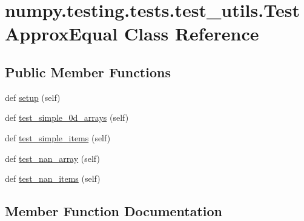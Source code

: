 \hypertarget{classnumpy_1_1testing_1_1tests_1_1test__utils_1_1TestApproxEqual}{}\section{numpy.\+testing.\+tests.\+test\+\_\+utils.\+Test\+Approx\+Equal Class Reference}
\label{classnumpy_1_1testing_1_1tests_1_1test__utils_1_1TestApproxEqual}
\subsection*{Public Member Functions}
\begin{DoxyCompactItemize}
\item 
def \hyperlink{classnumpy_1_1testing_1_1tests_1_1test__utils_1_1TestApproxEqual_a11b9926fc00819448956491c5e8757d2}{setup} (self)
\item 
def \hyperlink{classnumpy_1_1testing_1_1tests_1_1test__utils_1_1TestApproxEqual_acc2f61a6b487803b87dd06b2d012f88f}{test\+\_\+simple\+\_\+0d\+\_\+arrays} (self)
\item 
def \hyperlink{classnumpy_1_1testing_1_1tests_1_1test__utils_1_1TestApproxEqual_a57ab3663ef4f6b444edf47cd74a93d02}{test\+\_\+simple\+\_\+items} (self)
\item 
def \hyperlink{classnumpy_1_1testing_1_1tests_1_1test__utils_1_1TestApproxEqual_a0d217822bed46eabe2b7da70c173633c}{test\+\_\+nan\+\_\+array} (self)
\item 
def \hyperlink{classnumpy_1_1testing_1_1tests_1_1test__utils_1_1TestApproxEqual_a5f5f31d29b9335f36ca9863676c52f0a}{test\+\_\+nan\+\_\+items} (self)
\end{DoxyCompactItemize}


\subsection{Member Function Documentation}
\mbox{\label{classnumpy_1_1testing_1_1tests_1_1test__utils_1_1TestApproxEqual_a11b9926fc00819448956491c5e8757d2}} 
